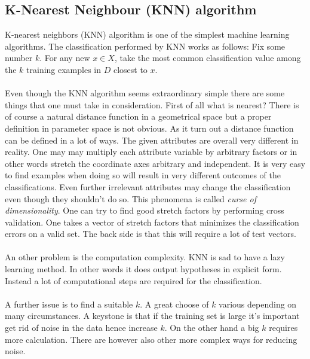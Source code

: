 \subsection{K-Nearest Neighbour (KNN) algorithm}
K-nearest neighbors (KNN) algorithm is one of the simplest machine learning
algorithms. The classification performed by KNN works as follows: Fix some
number $k$. For any new $x \in X$, take the most common classification value among
the $k$ training examples in $D$ closest to $x$.
\\\\
Even though the KNN algorithm
seems extraordinary simple there are some things that one must take in
consideration. First of all what is nearest? There is of course a natural
distance function in a geometrical space but a proper definition in parameter
space is not obvious. As it turn out a distance function can be defined in a lot
of ways. The given attributes are overall very different in reality.
One may may multiply each attribute variable by arbitrary factors or in other
words stretch the coordinate axes arbitrary and independent. It is very easy to
find examples when doing so will result in very different outcomes of the classifications.
Even further irrelevant attributes may change the classification even though they
shouldn't do so. This phenomena is called \emph{curse of dimensionality}. One
can try to find good stretch factors by performing cross validation.
One takes a vector of stretch factors that
minimizes the classification errors on a valid set. The back side is that
this will require a lot of test vectors.
\\\\
An other problem is the computation complexity. KNN is sad to have a lazy
learning method. In other words it does output hypotheses in explicit form.
Instead a lot of computational steps are required for the classification.
\\\\
A further issue is to find a suitable $k$. A great choose of $k$ various
depending on many circumstances. A keystone is that if the training set is large
it's important get rid of noise in the data hence increase $k$. On the other
hand a big $k$ requires more calculation. There are however also other more
complex ways for reducing noise.
